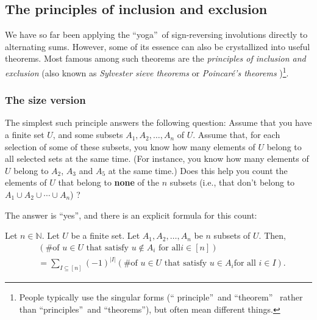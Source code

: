 \subsection{\label{sec.sign.pie}The principles of inclusion and exclusion}

We have so far been applying the \textquotedblleft yoga\textquotedblright\ of
sign-reversing involutions directly to alternating sums. However, some of its
essence can also be crystallized into useful theorems. Most famous among such
theorems are the \emph{principles of inclusion and exclusion} (also known as
\emph{Sylvester sieve theorems} or \emph{Poincar\'{e}'s theorems}%
)\footnote{People typically use the singular forms (\textquotedblleft
principle\textquotedblright\ and \textquotedblleft theorem\textquotedblright%
\ rather than \textquotedblleft principles\textquotedblright\ and
\textquotedblleft theorems\textquotedblright), but often mean different
things.}.

\subsubsection{\label{subsec.sign.pie.size}The size version}

The simplest such principle answers the following question: Assume that you
have a finite set $U$, and some subsets $A_{1},A_{2},\ldots,A_{n}$ of $U$.
Assume that, for each selection of some of these subsets, you know how many
elements of $U$ belong to all selected sets at the same time. (For instance,
you know how many elements of $U$ belong to $A_{2}$, $A_{3}$ and $A_{5}$ at
the same time.) Does this help you count the elements of $U$ that belong to
\textbf{none} of the $n$ subsets (i.e., that don't belong to $A_{1}\cup
A_{2}\cup\cdots\cup A_{n}$) ?

The answer is \textquotedblleft yes\textquotedblright, and there is an
explicit formula for this count:

\begin{theorem}
\label{thm.pie.1}Let $n\in\mathbb{N}$. Let $U$ be a
finite set. Let $A_{1},A_{2},\ldots,A_{n}$ be $n$ subsets of $U$. Then,%
\begin{align*}
&  \left(  \text{\# of }u\in U\text{ that satisfy }u\notin A_{i}\text{ for all
}i\in\left[  n\right]  \right) \\
&  =\sum_{I\subseteq\left[  n\right]  }\left(  -1\right)  ^{\left\vert
I\right\vert }\left(  \text{\# of }u\in U\text{ that satisfy }u\in A_{i}\text{
for all }i\in I\right)  .
\end{align*}

\end{theorem}

